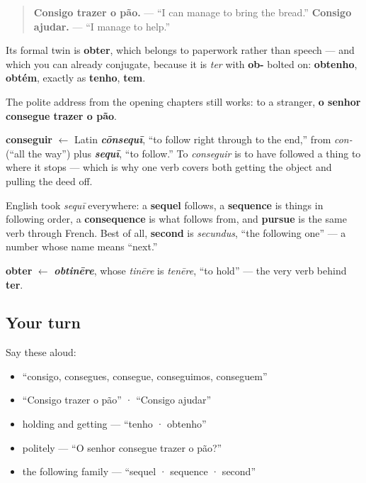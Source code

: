 \begin{quote}
\textbf{Consigo trazer o pão.} — \textquotedblleft{}I can manage to bring the bread.\textquotedblright{} \textbf{Consigo ajudar.} — \textquotedblleft{}I manage to help.\textquotedblright{}
\end{quote}

Its formal twin is \textbf{obter}, which belongs to paperwork rather than speech — and which you can already conjugate, because it is \emph{ter} with \textbf{ob-} bolted on: \textbf{obtenho}, \textbf{obtém}, exactly as \textbf{tenho}, \textbf{tem}.

The polite address from the opening chapters still works: to a stranger, \textbf{o senhor consegue trazer o pão}.

\begin{cousinweb}
\textbf{conseguir} $\leftarrow$ Latin \emph{\textbf{cōnsequī}}, \textquotedblleft{}to follow right through to the end,\textquotedblright{} from \emph{con-} (\textquotedblleft{}all the way\textquotedblright{}) plus \emph{\textbf{sequī}}, \textquotedblleft{}to follow.\textquotedblright{} To \emph{conseguir} is to have followed a thing to where it stops — which is why one verb covers both getting the object and pulling the deed off.

English took \emph{sequī} everywhere: a \textbf{sequel} follows, a \textbf{sequence} is things in following order, a \textbf{consequence} is what follows from, and \textbf{pursue} is the same verb through French. Best of all, \textbf{second} is \emph{secundus}, \textquotedblleft{}the following one\textquotedblright{} — a number whose name means \textquotedblleft{}next.\textquotedblright{}

\textbf{obter} $\leftarrow$ \emph{\textbf{obtinēre}}, whose \emph{tinēre} is \emph{tenēre}, \textquotedblleft{}to hold\textquotedblright{} — the very verb behind \textbf{ter}.
\end{cousinweb}

\subsection*{Your turn}
Say these aloud:

\begin{itemize}
\raggedright
  \item \textquotedblleft{}consigo, consegues, consegue, conseguimos, conseguem\textquotedblright{}
  \item \textquotedblleft{}Consigo trazer o pão\textquotedblright{} · \textquotedblleft{}Consigo ajudar\textquotedblright{}
  \item holding and getting — \textquotedblleft{}tenho · obtenho\textquotedblright{}
  \item politely — \textquotedblleft{}O senhor consegue trazer o pão?\textquotedblright{}
  \item the following family — \textquotedblleft{}sequel · sequence · second\textquotedblright{}
\end{itemize}

